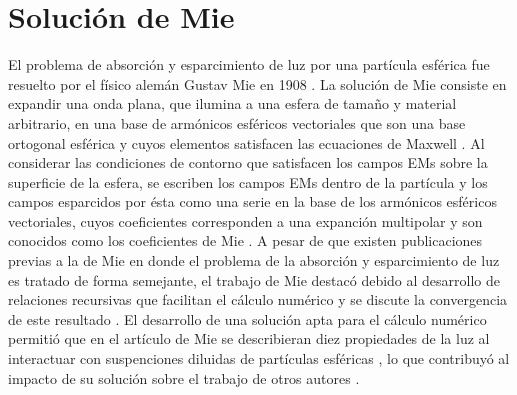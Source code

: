 \section{Solución de Mie}

El problema de absorción y esparcimiento de luz por una partícula esférica fue resuelto por el físico alemán Gustav Mie en 1908 \cite{mie1908metallosung}. La solución de Mie consiste en expandir una onda plana, que ilumina a una esfera de tamaño y material arbitrario, en una base de armónicos esféricos vectoriales que son una base ortogonal esférica y cuyos elementos satisfacen las ecuaciones de Maxwell \cite{bohren1998absorption}. Al considerar las condiciones de contorno que satisfacen los campos EMs sobre la superficie de la esfera, se escriben los campos EMs dentro de la partícula y los campos esparcidos por ésta como una serie en la base de los armónicos esféricos vectoriales, cuyos coeficientes corresponden a una expanción multipolar y son conocidos como los coeficientes de Mie \cite{bohren1998absorption}. A pesar de que existen publicaciones previas a la de Mie en donde  el problema de la absorción y esparcimiento de luz es tratado de forma semejante, el trabajo de Mie destacó debido al desarrollo de relaciones recursivas que facilitan el cálculo numérico y se discute la convergencia de este resultado \cite{horvath2009historic}. El desarrollo de una solución apta para el cálculo numérico permitió que en el artículo de Mie se describieran diez propiedades de la luz al interactuar con suspenciones diluidas de partículas esféricas \cite{mie1908metallosung}, lo que contribuyó al impacto de su solución sobre el trabajo de otros autores \cite{horvath2009historic}. 

